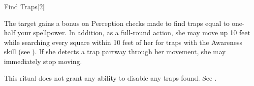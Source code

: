 \begin{spellsection}{Find Traps}[2]
    \begin{spellheader}
    \end{spellheader}
    \begin{spellcontent}
        \begin{spelltargetinginfo}
        \end{spelltargetinginfo}
        \begin{spelleffects}
            \spelleffect The target gains a bonus on Perception checks made to find traps equal to one-half your spellpower. In addition, as a full-round action, she may move up 10 feet while searching every square within 10 feet of her for traps with the Awareness skill (see ). If she detects a trap partway through her movement, she may immediately stop moving.
            \spelldur \durshort
        \end{spelleffects}
    \end{spellcontent}
    \begin{spellfooter}
        \spellnotes This ritual does not grant any ability to disable any traps found. See .
    \end{spellfooter}
    \begin{spellaugments}
    \end{spellaugments}
\end{spellsection}

